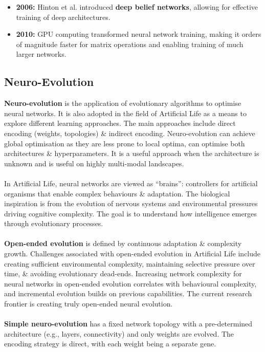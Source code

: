 \documentclass[a4paper,11pt]{article}
\begin{document}
\begin{itemize}
        \item   \textbf{2006:} Hinton et al. introduced \textbf{deep belief networks}, allowing for effective training of deep architectures.

        \item   \textbf{2010:} GPU computing transformed neural network training, making it orders of magnitude faster for matrix operations and enabling training of much larger networks.
\end{itemize}

\subsection{Neuro-Evolution}
\textbf{Neuro-evolution} is the application of evolutionary algorithms to optimise neural networks.
It is also adopted in the field of Artificial Life as a means to explore different learning approaches.
The main approaches include direct encoding (weights, topologies) \& indirect encoding.
Neuro-evolution can achieve global optimisation as they are less prone to local optima, can optimise both architectures \& hyperparameters.
It is a useful approach when the architecture is unknown and is useful on highly multi-modal landscapes.
\\\\
In Artificial Life, neural networks are viewed as ``brains'': controllers for artificial organisms that enable complex behaviours \& adaptation.
The biological inspiration is from the evolution of nervous systems and environmental pressures driving cognitive complexity.
The goal is to understand how intelligence emerges through evolutionary processes.
\\\\
\textbf{Open-ended evolution} is defined by continuous adaptation \& complexity growth.
Challenges associated with open-ended evolution in Artificial Life include creating sufficient environmental complexity, maintaining selective pressure over time, \& avoiding evolutionary dead-ends.
Increasing network complexity for neural networks in open-ended evolution correlates with behavioural complexity, and incremental evolution builds on previous capabilities.
The current research frontier is creating truly open-ended neural evolution.
\\\\
\textbf{Simple neuro-evolution} has a fixed network topology with a pre-determined architecture (e.g., layers, connectivity) and only weights are evolved.
The encoding strategy is direct, with each weight being a separate gene.
\end{document}
